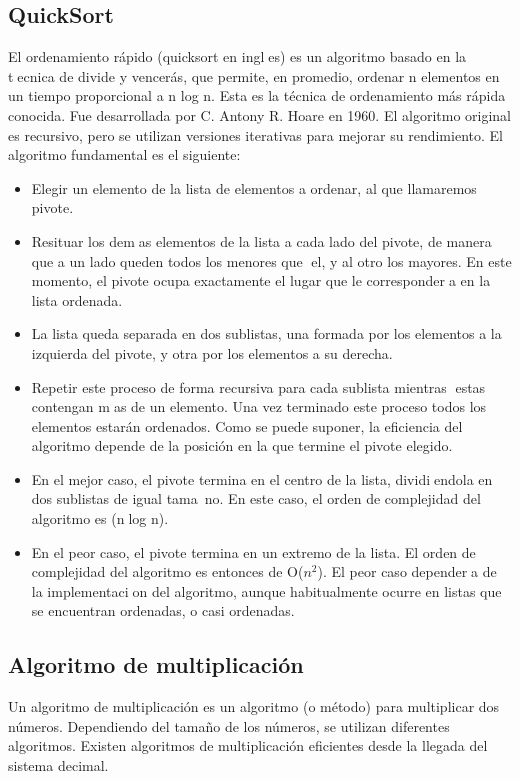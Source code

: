 \documentclass[12pt,twoside]{article}
\begin{document}
\subsection{QuickSort}
El ordenamiento r\'apido (quicksort en ingles) es un algoritmo basado en la
tecnica de divide y vencer\'as, que permite, en promedio, ordenar n elementos
en un tiempo proporcional a n log n. Esta es la t\'ecnica de ordenamiento m\'as
r\'apida conocida. Fue desarrollada por C. Antony R. Hoare en 1960. El algoritmo
original es recursivo, pero se utilizan versiones iterativas para mejorar
su rendimiento.
El algoritmo fundamental es el siguiente:
\begin{itemize}
    \item Elegir un elemento de la lista de elementos a ordenar, al que llamaremos
pivote.
    \item Resituar los demas elementos de la lista a cada lado del pivote, de manera
que a un lado queden todos los menores que el, y al otro los mayores. En este
momento, el pivote ocupa exactamente el lugar que le correspondera en la lista
ordenada.
\item La lista queda separada en dos sublistas, una formada por los elementos a la
izquierda del pivote, y otra por los elementos a su derecha.
\item Repetir este proceso de forma recursiva para cada sublista mientras estas
contengan mas de un elemento. Una vez terminado este proceso todos los elementos
estar\'an ordenados. Como se puede suponer, la eficiencia del algoritmo
depende de la posici\'on en la que termine el pivote elegido.
\item En el mejor caso, el pivote termina en el centro de la lista, dividiendola en dos
sublistas de igual tama~no. En este caso, el orden de complejidad del algoritmo
es (nlog n).
\item En el peor caso, el pivote termina en un extremo de la lista. El orden de
complejidad del algoritmo es entonces de O($n^2$). El peor caso dependera de la
implementacion del algoritmo, aunque habitualmente ocurre en listas que se
encuentran ordenadas, o casi ordenadas.
\end{itemize}
\subsection{Algoritmo de multiplicación}
Un algoritmo de multiplicación es un algoritmo (o método) para multiplicar dos números. Dependiendo del tamaño de los números, se utilizan diferentes algoritmos. Existen algoritmos de multiplicación eficientes desde la llegada del sistema decimal.
\end{document}
